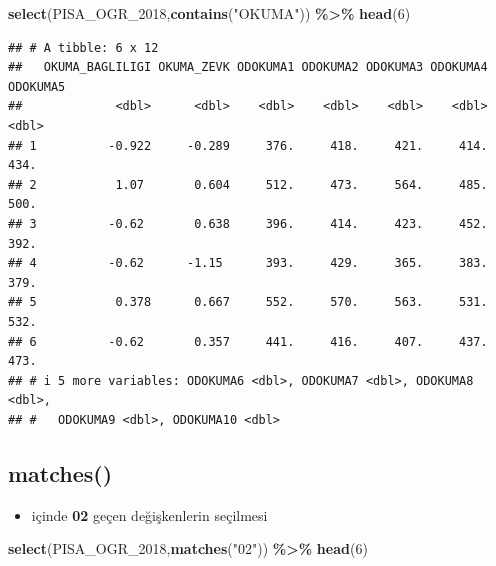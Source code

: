 \documentclass[
  oneside]{book}
\newenvironment{Shaded}{\begin{snugshade}}{\end{snugshade}}
\newcommand{\DecValTok}[1]{\textcolor[rgb]{0.00,0.00,0.81}{#1}}
\newcommand{\FunctionTok}[1]{\textcolor[rgb]{0.13,0.29,0.53}{\textbf{#1}}}
\newcommand{\NormalTok}[1]{#1}
\newcommand{\SpecialCharTok}[1]{\textcolor[rgb]{0.81,0.36,0.00}{\textbf{#1}}}
\newcommand{\StringTok}[1]{\textcolor[rgb]{0.31,0.60,0.02}{#1}}
\providecommand{\tightlist}{%
  \setlength{\itemsep}{0pt}\setlength{\parskip}{0pt}}
\begin{document}
\begin{Shaded}
\begin{Highlighting}[]
\FunctionTok{select}\NormalTok{(PISA\_OGR\_2018,}\FunctionTok{contains}\NormalTok{(}\StringTok{"OKUMA"}\NormalTok{)) }\SpecialCharTok{\%\textgreater{}\%} \FunctionTok{head}\NormalTok{(}\DecValTok{6}\NormalTok{)}
\end{Highlighting}
\end{Shaded}

\begin{verbatim}
## # A tibble: 6 x 12
##   OKUMA_BAGLILIGI OKUMA_ZEVK ODOKUMA1 ODOKUMA2 ODOKUMA3 ODOKUMA4 ODOKUMA5
##             <dbl>      <dbl>    <dbl>    <dbl>    <dbl>    <dbl>    <dbl>
## 1          -0.922     -0.289     376.     418.     421.     414.     434.
## 2           1.07       0.604     512.     473.     564.     485.     500.
## 3          -0.62       0.638     396.     414.     423.     452.     392.
## 4          -0.62      -1.15      393.     429.     365.     383.     379.
## 5           0.378      0.667     552.     570.     563.     531.     532.
## 6          -0.62       0.357     441.     416.     407.     437.     473.
## # i 5 more variables: ODOKUMA6 <dbl>, ODOKUMA7 <dbl>, ODOKUMA8 <dbl>,
## #   ODOKUMA9 <dbl>, ODOKUMA10 <dbl>
\end{verbatim}

\hypertarget{matches}{%
\subsection{\texorpdfstring{\textbf{matches()}}{matches()}}\label{matches}}

\begin{itemize}
\tightlist
\item
  içinde \textbf{02} geçen değişkenlerin seçilmesi
\end{itemize}

\begin{Shaded}
\begin{Highlighting}[]
\FunctionTok{select}\NormalTok{(PISA\_OGR\_2018,}\FunctionTok{matches}\NormalTok{(}\StringTok{"02"}\NormalTok{)) }\SpecialCharTok{\%\textgreater{}\%} \FunctionTok{head}\NormalTok{(}\DecValTok{6}\NormalTok{)}
\end{Highlighting}
\end{Shaded}
\end{document}
